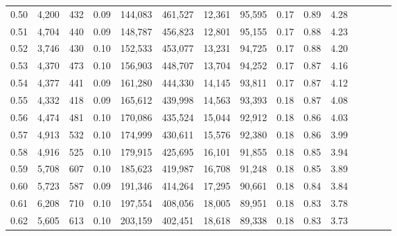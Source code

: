 \begin{tabular}{rrrcrrrrrrrrrrr}
0.50 &   4,200 &    432 &                                       0.09 &  144,083 &  461,527 &   12,361 &   95,595 &  0.17 &  0.89 &                         4.28 \\
0.51 &   4,704 &    440 &                                       0.09 &  148,787 &  456,823 &   12,801 &   95,155 &  0.17 &  0.88 &                         4.23 \\
0.52 &   3,746 &    430 &                                       0.10 &  152,533 &  453,077 &   13,231 &   94,725 &  0.17 &  0.88 &                         4.20 \\
0.53 &   4,370 &    473 &                                       0.10 &  156,903 &  448,707 &   13,704 &   94,252 &  0.17 &  0.87 &                         4.16 \\
0.54 &   4,377 &    441 &                                       0.09 &  161,280 &  444,330 &   14,145 &   93,811 &  0.17 &  0.87 &                         4.12 \\
0.55 &   4,332 &    418 &                                       0.09 &  165,612 &  439,998 &   14,563 &   93,393 &  0.18 &  0.87 &                         4.08 \\
0.56 &   4,474 &    481 &                                       0.10 &  170,086 &  435,524 &   15,044 &   92,912 &  0.18 &  0.86 &                         4.03 \\
0.57 &   4,913 &    532 &                                       0.10 &  174,999 &  430,611 &   15,576 &   92,380 &  0.18 &  0.86 &                         3.99 \\
0.58 &   4,916 &    525 &                                       0.10 &  179,915 &  425,695 &   16,101 &   91,855 &  0.18 &  0.85 &                         3.94 \\
0.59 &   5,708 &    607 &                                       0.10 &  185,623 &  419,987 &   16,708 &   91,248 &  0.18 &  0.85 &                         3.89 \\
0.60 &   5,723 &    587 &                                       0.09 &  191,346 &  414,264 &   17,295 &   90,661 &  0.18 &  0.84 &                         3.84 \\
0.61 &   6,208 &    710 &                                       0.10 &  197,554 &  408,056 &   18,005 &   89,951 &  0.18 &  0.83 &                         3.78 \\
0.62 &   5,605 &    613 &                                       0.10 &  203,159 &  402,451 &   18,618 &   89,338 &  0.18 &  0.83 &                         3.73 \\

\end{tabular}
